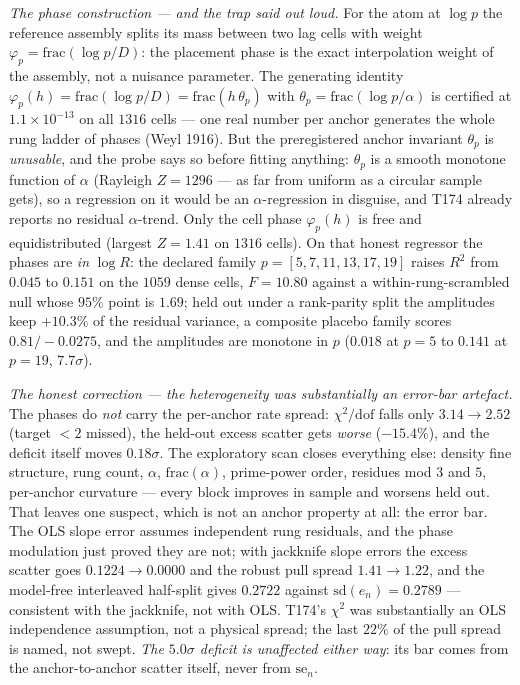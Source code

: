 \documentclass[11pt,a4paper]{article}
\begin{document}
\emph{The phase construction --- and the trap said out loud.} For the
atom at $\log p$ the reference assembly splits its mass between two lag
cells with weight $\varphi_p=\mathrm{frac}(\log p/D)$: the placement
phase is the exact interpolation weight of the assembly, not a nuisance
parameter. The generating identity
$\varphi_p(h)=\mathrm{frac}(\log p/D)=\mathrm{frac}(h\,\theta_p)$ with
$\theta_p=\mathrm{frac}(\log p/\alpha)$ is certified at
$1.1\times10^{-13}$ on all $1316$ cells --- one real number per anchor
generates the whole rung ladder of phases (Weyl 1916). But the
preregistered anchor invariant $\theta_p$ is \emph{unusable}, and the
probe says so before fitting anything: $\theta_p$ is a smooth monotone
function of $\alpha$ (Rayleigh $Z=1296$ --- as far from uniform as a
circular sample gets), so a regression on it would be an
$\alpha$-regression in disguise, and T174 already reports no residual
$\alpha$-trend. Only the cell phase $\varphi_p(h)$ is free and
equidistributed (largest $Z=1.41$ on $1316$ cells). On that honest
regressor the phases are \emph{in} $\log R$: the declared family
$p=[5,7,11,13,17,19]$ raises $R^2$ from $0.045$ to $0.151$ on the
$1059$ dense cells, $F=10.80$ against a within-rung-scrambled null
whose $95\%$ point is $1.69$; held out under a rank-parity split the
amplitudes keep $+10.3\%$ of the residual variance, a composite
placebo family scores $0.81/-0.0275$, and the amplitudes are monotone
in $p$ ($0.018$ at $p=5$ to $0.141$ at $p=19$, $7.7\sigma$).

\emph{The honest correction --- the heterogeneity was substantially an
error-bar artefact.} The phases do \emph{not} carry the per-anchor
rate spread: $\chi^2/\mathrm{dof}$ falls only $3.14\to2.52$ (target
$<2$ missed), the held-out excess scatter gets \emph{worse}
($-15.4\%$), and the deficit itself moves $0.18\sigma$. The
exploratory scan closes everything else: density fine structure, rung
count, $\alpha$, $\mathrm{frac}(\alpha)$, prime-power order, residues
mod $3$ and $5$, per-anchor curvature --- every block improves in
sample and worsens held out. That leaves one suspect, which is not an
anchor property at all: the error bar. The OLS slope error assumes
independent rung residuals, and the phase modulation just proved they
are not; with jackknife slope errors the excess scatter goes
$0.1224\to0.0000$ and the robust pull spread $1.41\to1.22$, and the
model-free interleaved half-split gives $0.2722$ against
$\mathrm{sd}(e_n)=0.2789$ --- consistent with the jackknife, not with
OLS. T174's $\chi^2$ was substantially an OLS independence assumption,
not a physical spread; the last $22\%$ of the pull spread is named,
not swept. \emph{The $5.0\sigma$ deficit is unaffected either way}:
its bar comes from the anchor-to-anchor scatter itself, never from
$\mathrm{se}_n$.
\end{document}
